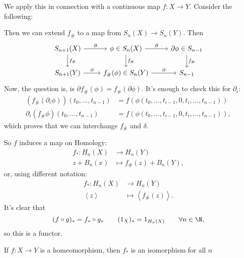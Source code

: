 We apply this in connection with a continuous map $f: X \to Y$.
Consider the following:

\begin{figure}[H]
    \centering
    \label{fig:homology-connection-with-continuous-map}
\end{figure}

Then we can extend $f_\#$ to a map from  $S_n(X) \to  S_n(Y)$.
Then
\[
    \begin{tikzcd}
        S_{n+1}(X) \arrow[r, "\partial"]  \arrow[d, "f_\#"]& \phi \in S_n(X) \arrow[d, "f_\#"]\arrow[r, "\partial"] &\partial\phi \in S_{n-1}\arrow[d, "f_\#"]\\
        S_{n+1}(Y) \arrow[r, "\partial"] & f_\#(\phi) \in S_n(Y) \arrow[r, "\partial"] &S_{n-1}
    \end{tikzcd}
\]
Now, the question is, is $\partial f_\#(\phi) = f_\# ( \partial\phi)$.
It's enough to check this for $\partial_i$:
\begin{align*}
    (f_\#(\partial_i \phi))(t_0, \ldots, t_{n-1}) &= f(\phi(t_0, \ldots, t_{i-1}, 0, t_i, \ldots, t_{n-1}))\\
    \partial_i (f_\# \phi)(t_0, \ldots, t_{n-1}) &= f(\phi(t_0, \ldots, t_{i-1}, 0, t_i, \ldots, t_{n-1}))
,\end{align*}
which proves that we can interchange $f_\#$ and $\delta$.

So $f$ induces a map on Homology:
\begin{align*}
    f_*: H_n(X) &\longrightarrow H_n(Y) \\
    z+B_n(x) &\longmapsto f_\#(z) + B_n(Y)
,\end{align*}
or, using different notation:
\begin{align*}
    f_*: H_n(X) &\longrightarrow H_n(Y) \\
    \left<z \right> &\longmapsto \left<f_\#(z) \right>
.\end{align*}
It's clear that
\[
    (f  \circ  g)_* = f_*  \circ  g_* \qquad (1_X)_* = 1_{H_n(X)} \qquad \forall n \in \N
,\] 
so this is a functor.
\begin{theorem}
    If $f: X \to  Y$ is a homeomorphism, then $f_*$ is an isomorphism for all $n$
\end{theorem}

